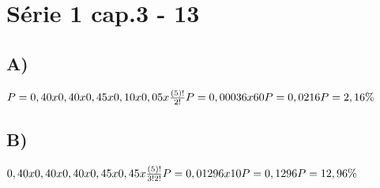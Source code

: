 \section*{Série 1 cap.3 - 13}

    \subsection*{A)}
    $P = 0,40 x 0,40 x 0,45 x 0,10 x 0,05 x \frac{(5)!}{2!}
    \newline
    P = 0,00036 x 60
    \newline
    P = 0,0216 
    \newline
    P = 2,16\%$
    
    \subsection*{B)}
    $0,40 x 0,40 x 0,40 x 0,45 x 0,45 x \frac{(5)!}{3!2!}
    \newline
    P = 0,01296 x 10
    \newline
    P = 0,1296
    \newline
    P = 12,96\%$
